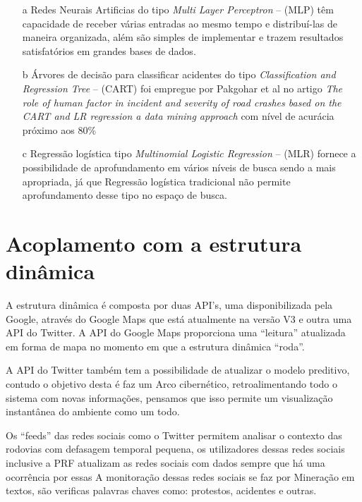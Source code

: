 \begin{itemize}
 \item[a] Redes Neurais Artificias do tipo \textit{ Multi Layer Perceptron}  -- (MLP) têm capacidade de receber várias entradas ao mesmo tempo e distribuí-las de maneira organizada, além 
	  são simples de implementar e trazem resultados satisfatórios em grandes bases de dados.
 
 \item[b] Árvores de decisão para classificar acidentes do tipo \textit{ Classification and Regression Tree}  -- (CART) foi empregue por Pakgohar et al no artigo 
	  \textit{The role of human factor in incident and severity of road crashes based on the CART and LR regression a data mining approach}  com nível de acurácia próximo aos 80\%

 \item[c] Regressão logística tipo \textit{Multinomial Logistic Regression} -- (MLR) fornece a possibilidade de aprofundamento em vários níveis de busca sendo a mais apropriada, já que Regressão logística 
	  tradicional não permite aprofundamento desse tipo no espaço de busca.
\end{itemize}


\pagebreak

\section{Acoplamento com a estrutura dinâmica}

A estrutura dinâmica é composta por duas API's, uma disponibilizada pela Google, através do Google Maps que está atualmente na versão V3 e 
outra uma API do Twitter. A API do Google Maps proporciona uma ``leitura'' atualizada em forma de mapa no momento em que a estrutura dinâmica ``roda''. 

A API do Twitter também tem a possibilidade de atualizar o modelo preditivo, contudo o objetivo desta é faz um Arco cibernético, 
retroalimentando todo o sistema com novas informações, pensamos que isso permite um visualização instantânea do ambiente como um todo.

Os ``feeds'' das redes sociais como o Twitter permitem analisar o contexto das rodovias com defasagem temporal 
pequena, os utilizadores dessas redes sociais inclusive a PRF atualizam as redes sociais com dados sempre que há uma ocorrência por essas 
A monitoração dessas redes sociais se faz por Mineração em textos, são verificas palavras chaves como: protestos, acidentes e outras.




